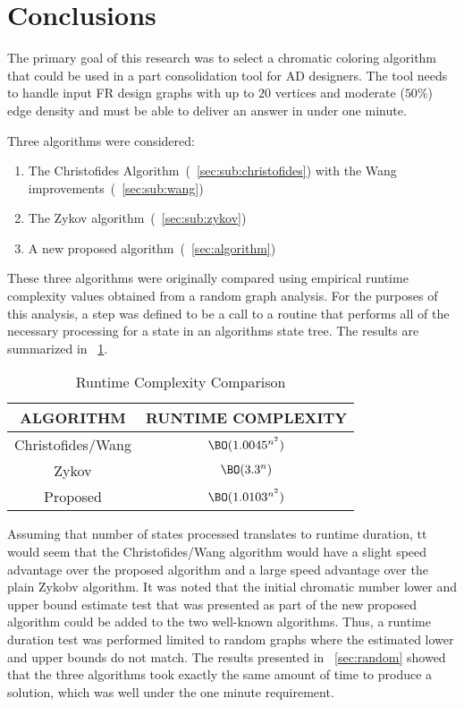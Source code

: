 \section{Conclusions}\label{sec:conclusions}

The primary goal of this research was to select a chromatic coloring algorithm that could be used in a part
consolidation tool for AD designers.  The tool needs to handle input FR design graphs with up to \(20\)
vertices and moderate (\(50\%\)) edge density and must be able to deliver an answer in under one minute.

Three algorithms were considered:
\begin{enumerate}
\item The Christofides Algorithm~(\sectionname~\ref{sec:sub:christofides}) with the
  Wang improvements~(\sectionname~\ref{sec:sub:wang})
\item The Zykov algorithm~(\sectionname~\ref{sec:sub:zykov})
\item A new proposed algorithm~(\sectionname~\ref{sec:algorithm})
\end{enumerate}

These three algorithms were originally compared using empirical runtime complexity values obtained from a random
graph analysis.  For the purposes of this analysis, a step was defined to be a call to a routine that performs all
of the necessary processing for a state in an algorithms state tree.  The results are summarized in
\tablename~\ref{tab:rtresults}.

\begin{table}[H]
  \centering
  \caption{Runtime Complexity Comparison}
  \label{tab:rtresults}
  \begin{tabular}{|c|c|}
    \hline
    ALGORITHM & RUNTIME COMPLEXITY \\
    \hline
    Christofides/Wang & \(\BO(1.0045^{n^2})\) \\
    \hline
    Zykov & \(\BO(3.3^n)\) \\
    \hline
    Proposed & \(\BO(1.0103^{n^2})\) \\
    \hline
  \end{tabular}
\end{table}

Assuming that number of states processed translates to runtime duration, tt would seem that the Christofides/Wang
algorithm would have a slight speed advantage over the proposed algorithm and a large speed advantage over the
plain Zykobv algorithm.  It was noted that the initial chromatic number lower and upper bound estimate test that was
presented as part of the new proposed algorithm could be added to the two well-known algorithms.  Thus, a runtime
duration test was performed limited to random graphs where the estimated lower and upper bounds do not match.  The
results presented in \sectionname~\ref{sec:random} showed that the three algorithms took exactly the same amount of
time to produce a solution, which was well under the one minute requirement.

